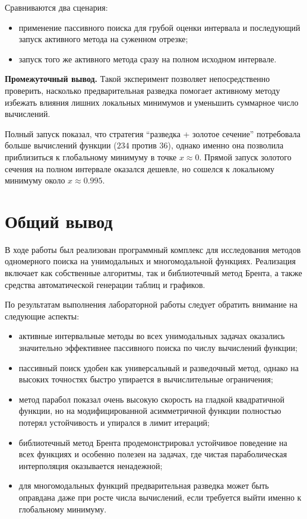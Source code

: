 \documentclass[14pt,a4paper]{extarticle}
\begin{document}
Сравниваются два сценария:
\begin{itemize}
    \item применение пассивного поиска для грубой оценки интервала и последующий запуск активного метода на суженном отрезке;
    \item запуск того же активного метода сразу на полном исходном интервале.
\end{itemize}

\textbf{Промежуточный вывод.} Такой эксперимент позволяет непосредственно проверить, насколько предварительная разведка помогает активному методу избежать влияния лишних локальных минимумов и уменьшить суммарное число вычислений.

Полный запуск показал, что стратегия ``разведка + золотое сечение'' потребовала больше вычислений функции ($234$ против $36$), однако именно она позволила приблизиться к глобальному минимуму в точке $x \approx 0$. Прямой запуск золотого сечения на полном интервале оказался дешевле, но сошелся к локальному минимуму около $x \approx 0.995$.

\section{Общий вывод}

В ходе работы был реализован программный комплекс для исследования методов одномерного поиска на унимодальных и многомодальной функциях. Реализация включает как собственные алгоритмы, так и библиотечный метод Брента, а также средства автоматической генерации таблиц и графиков.

По результатам выполнения лабораторной работы следует обратить внимание на следующие аспекты:
\begin{itemize}
    \item активные интервальные методы во всех унимодальных задачах оказались значительно эффективнее пассивного поиска по числу вычислений функции;
    \item пассивный поиск удобен как универсальный и разведочный метод, однако на высоких точностях быстро упирается в вычислительные ограничения;
    \item метод парабол показал очень высокую скорость на гладкой квадратичной функции, но на модифицированной асимметричной функции полностью потерял устойчивость и упирался в лимит итераций;
    \item библиотечный метод Брента продемонстрировал устойчивое поведение на всех функциях и особенно полезен на задачах, где чистая параболическая интерполяция оказывается ненадежной;
    \item для многомодальных функций предварительная разведка может быть оправдана даже при росте числа вычислений, если требуется выйти именно к глобальному минимуму.
\end{itemize}
\end{document}
